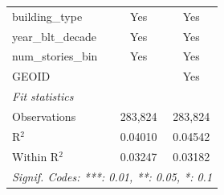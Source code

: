 \begin{tabular}{lcc}
   building\_type          & Yes            & Yes\\  
   year\_blt\_decade       & Yes            & Yes\\  
   num\_stories\_bin       & Yes            & Yes\\  
   GEOID                   &                & Yes\\  
   \midrule
   \emph{Fit statistics}\\
   Observations            & 283,824        & 283,824\\  
   R$^2$                   & 0.04010        & 0.04542\\  
   Within R$^2$            & 0.03247        & 0.03182\\  
   \midrule \midrule
   \multicolumn{3}{l}{\emph{Signif. Codes: ***: 0.01, **: 0.05, *: 0.1}}\\
\end{tabular}
\par\endgroup
\begingroup
\centering
